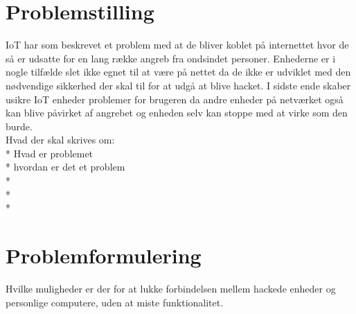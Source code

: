 \section{Problemstilling}

IoT har som beskrevet et problem med at de bliver koblet på internettet hvor de så er udsatte for en lang række angreb fra ondsindet personer. Enhederne er i nogle tilfælde slet ikke egnet til at være på nettet da de ikke er udviklet med den nødvendige sikkerhed der skal til for at udgå at blive hacket. I sidste ende skaber usikre IoT enheder problemer for brugeren da andre enheder på netværket også kan blive påvirket af angrebet og enheden selv kan stoppe med at virke som den burde.\\

Hvad der skal skrives om:\\
* Hvad er problemet \\
* hvordan er det et problem\\
* \\
* \\
* \\


\section{Problemformulering}
Hvilke muligheder er der for at lukke forbindelsen mellem hackede enheder og personlige computere, uden at miste funktionalitet.
\\
\\
